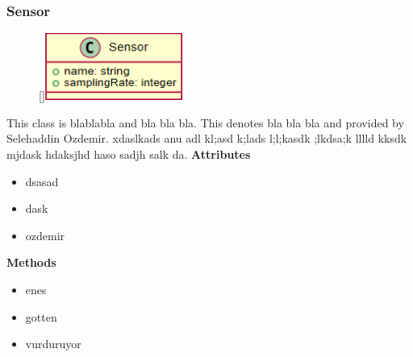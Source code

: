 \subsubsection{Sensor}
\begin{figure}
    \raisebox{0pt}[\dimexpr{}\baselineskip\relax]{\includegraphics[width=4.5cm]{classes/model-management/3.png}}
\end{figure} 
\par
This class is blablabla and bla bla bla. This denotes bla bla bla and provided by Selehaddin Ozdemir. xdaslkads anu adl kl;asd k;lads l;l;kasdk ;lkdsa;k lllld kksdk mjdask hdaksjhd haso sadjh salk da.
\newline
\newline
\textbf{Attributes}
\begin{itemize}
    \item dsasad
    \item dask
    \item ozdemir
\end{itemize}
\textbf{Methods}
\begin{itemize}
    \item enes
    \item gotten
    \item vurduruyor
\end{itemize}

